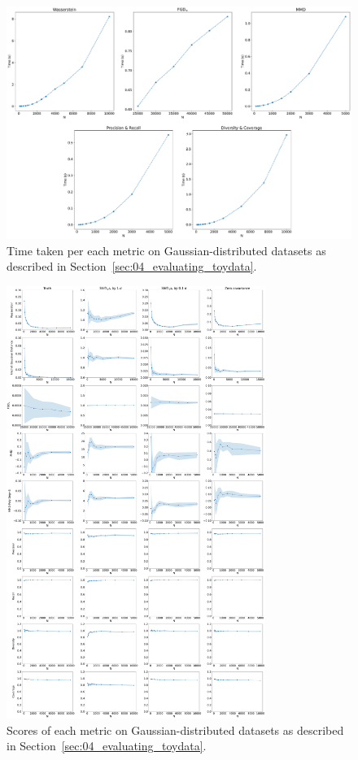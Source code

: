 \begin{figure}[htpb]
    \centering
    \includegraphics[width=\textwidth]{figures/04-ML4Sim/evaluating/timings.pdf}
    \caption{Time taken per each metric on Gaussian-distributed datasets as described in Section~\ref{sec:04_evaluating_toydata}.}
    \label{fig:04_evaluating_timings}
\end{figure}

\begin{figure}[htpb]
    \centering
    \includegraphics[width=0.75\textwidth]{figures/04-ML4Sim/evaluating/toy_scores_1.pdf}
    \caption{Scores of each metric on Gaussian-distributed datasets as described in Section~\ref{sec:04_evaluating_toydata}.}
    \label{fig:04_evaluating_toyscores1}
\end{figure}

